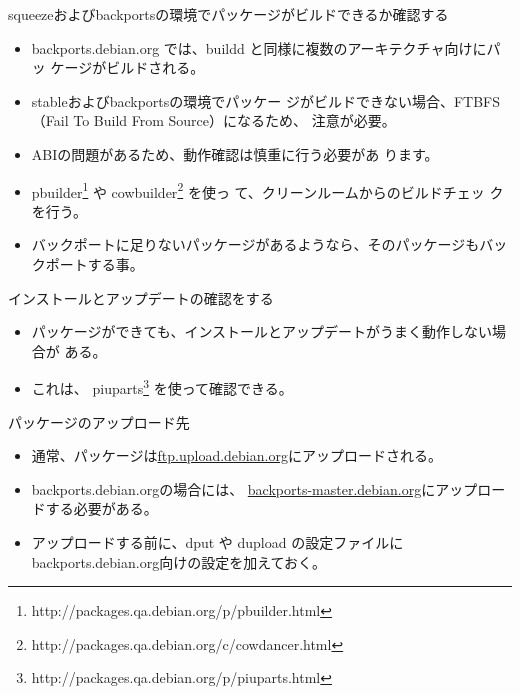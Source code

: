 \begin{frame}[containsverbatim]{squeezeおよびbackportsの環境でパッケージがビルドできるか確認する}
\begin{itemize}
\item backports.debian.org では、buildd と同様に複数のアーキテクチャ向けにパッ
ケージがビルドされる。
\item stableおよびbackportsの環境でパッケー
ジがビルドできない場合、FTBFS（Fail To Build From Source）になるため、
注意が必要。
\item ABIの問題があるため、動作確認は慎重に行う必要があ
ります。

\item pbuilder\footnote{http://packages.qa.debian.org/p/pbuilder.html}
や cowbuilder\footnote{http://packages.qa.debian.org/c/cowdancer.html} を使っ
て、クリーンルームからのビルドチェッ
クを行う。
\item バックポートに足りないパッケージがあるようなら、そのパッケージもバッ
      クポートする事。
\end{itemize}

\end{frame}

\begin{frame}[containsverbatim]{インストールとアップデートの確認をする}
\begin{itemize}
\item パッケージができても、インストールとアップデートがうまく動作しない場合が
 ある。
\item これは、
piuparts\footnote{http://packages.qa.debian.org/p/piuparts.html}
を使って確認できる。
\end{itemize}

\end{frame}


\begin{frame}[containsverbatim]{パッケージのアップロード先}
\begin{itemize}
\item 通常、パッケージは\url{ftp.upload.debian.org}にアップロードされる。
\item backports.debian.orgの場合には、
\url{backports-master.debian.org}にアップロードする必要がある。
\item アップロードする前に、dput や dupload 
の設定ファイルにbackports.debian.org向けの設定を加えておく。
\end{itemize}


\end{frame}

